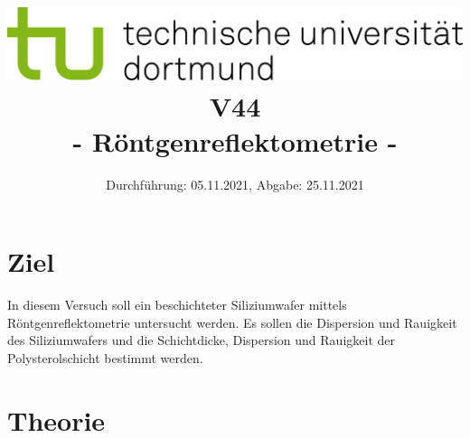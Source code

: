
\usepackage{romannum}
\usepackage{listings}
\lstset{numbers=left, numberstyle=\tiny, numbersep=5pt}
\lstset{language=Perl}

\title{\includegraphics[scale=0.8]{../logo.jpg} \\ \vspace*{1cm} V44 \\ - Röntgenreflektometrie -}

\date{Durchführung: 05.11.2021, Abgabe: 25.11.2021}



\maketitle

\tableofcontents
\newpage

\section{Ziel}
In diesem Versuch soll ein beschichteter Siliziumwafer mittels Röntgenreflektometrie untersucht werden. 
Es sollen die Dispersion und Rauigkeit des Siliziumwafers und die Schichtdicke, 
Dispersion und Rauigkeit der Polysterolschicht bestimmt werden.

\section{Theorie}
\label{sec:theorie}

